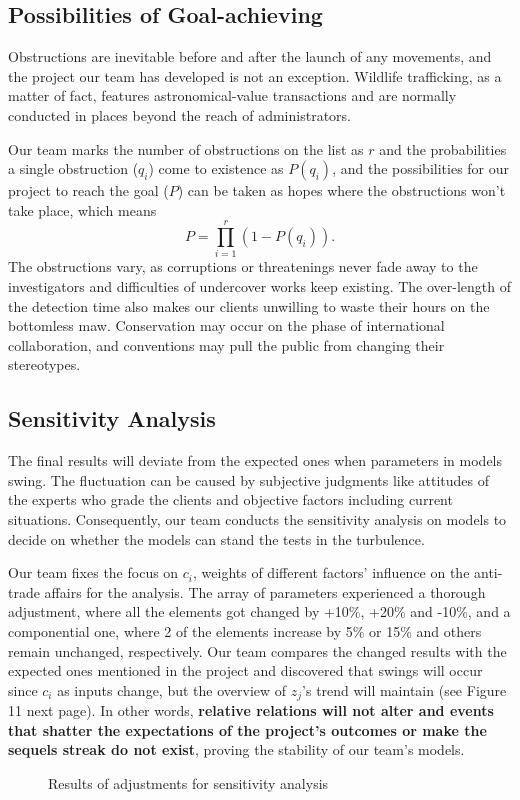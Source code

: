 \documentclass[12pt]{article}
\begin{document}
\subsection{Possibilities of Goal-achieving}
Obstructions are inevitable before and after the launch of any movements, and the project our team has developed is not an exception. Wildlife trafficking, as a matter of fact, features astronomical-value transactions and are normally conducted in places beyond the reach of administrators.

Our team marks the number of obstructions on the list as $r$ and the probabilities a single obstruction ($q_i$) come to existence as $P(q_i)$, and the possibilities for our project to reach the goal ($P$) can be taken as hopes where the obstructions won't take place, which means
\begin{equation}
	P=\prod_{i=1}^r(1-P(q_i)).
\end{equation}
The obstructions vary, as corruptions or threatenings never fade away to the investigators and difficulties of undercover works keep existing. The over-length of the detection time also makes our clients unwilling to waste their hours on the bottomless maw. Conservation may occur on the phase of international collaboration, and conventions may pull the public from changing their stereotypes.

\subsection{Sensitivity Analysis}

The final results will deviate from the expected ones when parameters in models swing. The fluctuation can be caused by subjective judgments like attitudes of the experts who grade the clients and objective factors including current situations. Consequently, our team conducts the sensitivity analysis on models to decide on whether the models can stand the tests in the turbulence.

Our team fixes the focus on $c_i$, weights of different factors' influence on the anti-trade affairs for the analysis. The array of parameters experienced a thorough adjustment, where all the elements got changed by +10\%, +20\% and -10\%, and a componential one, where 2 of the elements increase by 5\% or 15\% and others remain unchanged, respectively. Our team compares the changed results with the expected ones mentioned in the project and discovered that swings will occur since $c_i$ as inputs change, but the overview of $z_j$'s trend will maintain (see Figure 11 next page). In other words, \textbf{relative relations will not alter and events that shatter the expectations of the project's outcomes or make the sequels streak do not exist}, proving the stability of our team's models.
\clearpage
\begin{figure}[htbp]
\centering
\caption{Results of adjustments for sensitivity analysis}
\end{figure}
\end{document}

